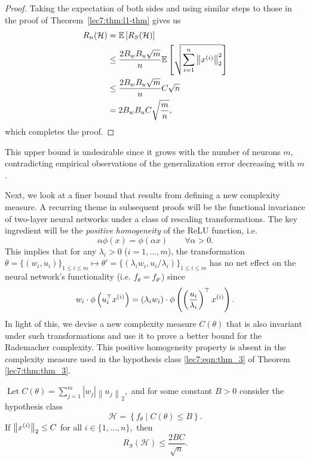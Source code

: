 \begin{proof}
    Taking the expectation of both sides and using similar steps to those in the proof of Theorem~\ref{lec7:thm:l1-thm} gives us
    \begin{align}
        R_n(\mathcal{H})  &= \E\left[ R_S(\mathcal{H})\right] \\
        &\leq \frac{2B_wB_u\sqrt{m}}{n} \E\sbr{\sqrt{\sum_{i=1}^n \Norm{x\sp{i}}_2^2}} \\
        &\leq \frac{2B_wB_u\sqrt{m}}{n} C\sqrt{n} \\
        &= 2 B_w B_u C\sqrt{\frac{m}{n}},
    \end{align}
    which completes the proof.
    
\end{proof}

This upper bound is undesirable since it grows with the number of neurons $m$, contradicting empirical observations of the generalization error decreasing with $m$.


\newcommand{\boundsforcomp}{B}
Next, we look at a finer bound that results from defining a new complexity measure. A recurring theme in subsequent proofs will be the functional invariance of two-layer neural networks under a class of rescaling transformations. The key ingredient will be the \textit{positive homogeneity} of the ReLU function, i.e.
\begin{equation}
\alpha \phi(x) = \phi(\alpha x) \qquad \forall \alpha > 0.
\end{equation}
This implies that for any $\lambda_i > 0$ ($i = 1, \dots, m$), the transformation $\theta = \{(w_i, u_i)\}_{1 \leq i \leq m} \mapsto \theta' = \{(\lambda_i w_i,  u_i / \lambda_i )\}_{1 \leq i \leq m}$ has no net effect on the neural network's functionality (i.e. $f_{\theta} = f_{\theta'}$) since 
\begin{equation}
w_i\cdot \phi \left(u_i^\top x\sp i \right) = (\lambda_i w_i) \cdot \phi\l(\l( \frac{u_i}{\lambda_i}\r)^\top x\sp i\r).   
\end{equation}
In light of this, we devise a new complexity measure $C(\theta)$ that is also invariant under such transformations and use it to prove a better bound for the Rademacher complexity. This positive homogeneity property is absent in the complexity measure used in the hypothesis class \eqref{lec7:eqn:thm_3} of Theorem \ref{lec7:thm:thm_3}.

\begin{theorem}\label{lec8:thm:thm-improved-nn-rc}
$\operatorname{Let} C(\theta)=\sum_{j=1}^{m}\left|w_{j}\right|\left\|u_{j}\right\|_{2},$ and for some constant $\boundsforcomp>0$ consider the hypothesis class
\begin{equation}
\mathcal{H}=\left\{f_{\theta} \mid C(\theta) \leq \boundsforcomp\right\}. \label{eqn:H}
\end{equation}
If $\left\|x\sp{i}\right\|_{2} \leq C$ for all $i \in\{1, \ldots, n\},$ then
\begin{equation}
R_{S}(\mathcal{H}) \leq \frac{2 \boundsforcomp C}{\sqrt{n}}.
\end{equation}
\end{theorem}

